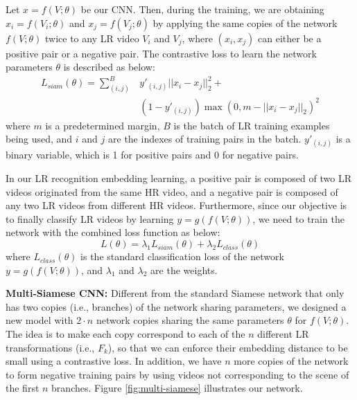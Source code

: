 \documentclass[letterpaper]{article} %
\begin{document}
Let $x = f(V ; \theta)$ be our CNN. Then, during the training, we are obtaining $x_i = f(V_i ; \theta)$ and $x_j = f(V_j ; \theta)$ by applying the same copies of the network $f(V ; \theta)$ twice to any LR video $V_i$ and $V_j$, where $(x_i, x_j)$ can either be a positive pair or a negative pair. The contrastive loss to learn the network parameters $\theta$ is described as below:
\begin{equation}
\begin{split}
    L_{siam}(\theta)=\sum_{(i,j)}^B &y'_{(i,j)} ||x_i - x_j||_2^2 + \\
                                &(1-y'_{(i,j)}) \max(0, m-||x_i - x_j||_2)^2
\end{split}
\end{equation}
where $m$ is a predetermined margin, $B$ is the batch of LR training examples being used, and $i$ and $j$ are the indexes of training pairs in the batch. $y'_{(i,j)}$ is a binary variable, which is 1 for positive pairs and 0 for negative pairs.

In our LR recognition embedding learning, a positive pair is composed of two LR videos originated from the same HR video, and a negative pair is composed of any two LR videos from different HR videos. Furthermore, since our objective is to finally classify LR videos by learning $y = g(f(V; \theta))$, we need to train the network with the combined loss function as below:
\begin{equation}
\label{eq:combined-loss}
L(\theta)= \lambda_1 L_{siam}(\theta) + \lambda_2 L_{class}(\theta)
\end{equation}
where $L_{class}(\theta)$ is the standard classification loss of the network $y = g(f(V ; \theta))$, and $\lambda_1$ and $\lambda_2$ are the weights.


{\flushleft\textbf{Multi-Siamese CNN:} Different from the standard Siamese network that only has two copies (i.e., branches) of the network sharing parameters, we designed a new model with $2 \cdot n$ network copies sharing the same parameters $\theta$ for $f(V ; \theta)$. The idea is to make each copy correspond to each of the $n$ different LR transformations (i.e., $F_k$), so that we can enforce their embedding distance to be small using a contrastive loss. In addition, we have $n$ more copies of the network to form negative training pairs by using videos not corresponding to the scene of the first $n$ branches. Figure \ref{fig:multi-siamese} illustrates our network.}
\end{document}
